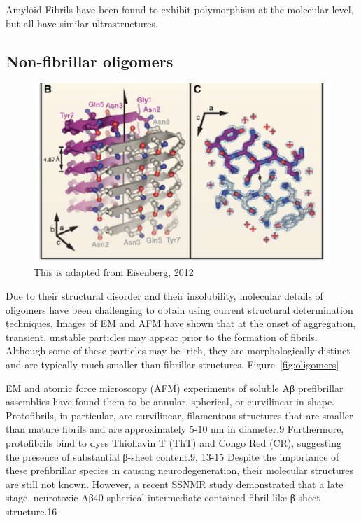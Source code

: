 
Amyloid Fibrils have been found to exhibit polymorphism at the molecular level, but all have similar ultrastructures.  %


\subsection{Non-fibrillar oligomers}
\begin{figure}
  \centering
  \includegraphics[width=6in]{figures/introduction/fibril_xray_model.pdf}
  \caption[Characteristic cross-$\beta$ spacings from X-ray fibre diffraction studies of amyloid fibrils]{This is adapted from Eisenberg, 2012}
  \label{fig:fibril_xray_model}
\end{figure}

Due to their structural disorder and their insolubility, molecular details of oligomers have been challenging to obtain using current structural determination techniques. Images of EM  and AFM  have shown that at the onset of aggregation, transient, unstable particles may appear prior to the formation of fibrils. Although some of these particles may be \bsheet-rich, they are morphologically distinct and are typically much smaller than fibrillar structures. Figure~\ref{fig:oligomers}

EM and atomic force microscopy (AFM) experiments of soluble Aβ prefibrillar assemblies have found them to be annular, spherical, or curvilinear in shape. Protofibrils, in particular, are curvilinear, filamentous structures that are smaller than mature fibrils and are approximately 5-10 nm in diameter.9 Furthermore, protofibrils bind to dyes Thioflavin T (ThT) and Congo Red (CR), suggesting the presence of substantial β-sheet content.9, 13-15 Despite the importance of these prefibrillar species in causing neurodegeneration, their molecular structures are still not known. However, a recent SSNMR study demonstrated that a late stage, neurotoxic Aβ40 spherical intermediate contained fibril-like β-sheet structure.16

